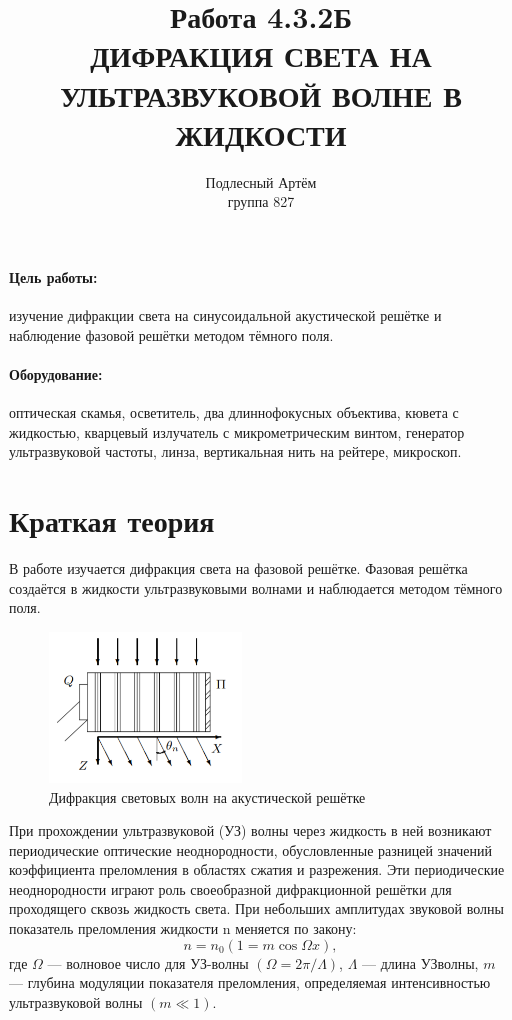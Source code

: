 \documentclass[a4paper, 14pt]{extarticle}%
\author{Подлесный Артём \\ группа 827}
\title{Работа 4.3.2Б \\ ДИФРАКЦИЯ СВЕТА НА УЛЬТРАЗВУКОВОЙ ВОЛНЕ В ЖИДКОСТИ}
\newcommand\ECaption[1]{%
     \captionsetup{font=footnotesize}%
     \caption{#1}}
\begin{document}
\maketitle

\paragraph*{Цель работы:} изучение дифракции света на синусоидальной акустической решётке и наблюдение фазовой решётки методом тёмного
поля.

\paragraph*{Оборудование:} оптическая скамья, осветитель, два длиннофокусных объектива, кювета с жидкостью, кварцевый излучатель
с микрометрическим винтом, генератор ультразвуковой частоты, линза, вертикальная нить на рейтере, микроскоп.

\section*{Краткая теория}

В работе изучается дифракция света на фазовой решётке. Фазовая
решётка создаётся в жидкости ультразвуковыми волнами и наблюдается методом тёмного поля.
\begin{figure}
\begin{center}
\includegraphics[height=4cm]{teor.png}
\end{center}
\ECaption{Дифракция световых волн
на акустической решётке}
\end{figure}
При прохождении ультразвуковой (УЗ) волны через жидкость
в ней возникают периодические оптические неоднородности, обусловленные разницей значений коэффициента преломления в областях
сжатия и разрежения. Эти периодические неоднородности играют
роль своеобразной дифракционной
решётки для проходящего сквозь
жидкость света.
При небольших амплитудах звуковой волны показатель преломления жидкости n меняется по закону:
\begin{equation}
n = n_0(1 = m\cos \Omega x),
\end{equation}
где $\Omega$ — волновое число для УЗ-волны $(\Omega = 2\pi/\Lambda)$, $\Lambda$ — длина УЗволны, $m$ — глубина модуляции показателя преломления, определяемая
интенсивностью ультразвуковой волны $(m \ll 1)$.
\end{document}
